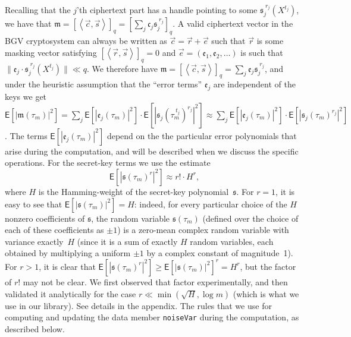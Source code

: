\documentclass[14pt]{extarticle}
\newcommand{\grp}[1]{\left\langle #1 \right\rangle}
\def\EXP{\mathsf{E}}
\def\vr{\vec{r}}
\def\ve{\vec{e}}
\def\vc{\vec{c}}
\def\vs{\vec{s}}
\newcommand{\ee}{\mathfrak{e}}
\newcommand{\ct}{\mathfrak{c}}
\newcommand{\mm}{\mathfrak{m}}
\newcommand{\sk}{\mathfrak{s}}
\begin{document}
Recalling that the $j$'th ciphertext part has a handle pointing to
some $\sk_j^{\;r_j}(X^{t_j})$, we have that $\mm=[\grp{\vc,\vs}]_q=
[\sum_j\ct_j\sk_j^{\;r_j}]_q$. A valid ciphertext vector in the BGV
cryptosystem can always be written as $\vc=\vr+\ve$ such that $\vr$
is some masking vector satisfying $[\grp{\vr,\vs}]_q=0$ and $\ve=
(\ee_1,\ee_2,\ldots)$ is such that $\|\ee_j\cdot\sk_j^{\;r_j}(X^{t_j})
\|\ll q$. We therefore have $\mm=[\grp{\vc,\vs}]_q=\sum_j\ee_j
\sk_j^{\;r_j}$, and under the heuristic assumption that the ``error
terms'' $\ee_j$ are independent of the keys we get 
$\EXP[|\mm(\tau_m)|^2] = \sum_j\EXP[|\ee_j(\tau_m)|^2] \cdot 
                               \EXP[|\sk_j(\tau_m^{\;t_j})^{r_j}|^2]
\approx \sum_j\EXP[|\ee_j(\tau_m)|^2] \cdot \EXP[|\sk_j(\tau_m)^{r_j}|^2]$.
The terms $\EXP[|\ee_j(\tau_m)|^2]$ depend on the the particular error
polynomials that arise during the computation, and will be described
when we discuss the specific operations. For the secret-key terms we
use the estimate
\[
\EXP\left[\left|\sk(\tau_m)^{r}\right|^2\right]\approx r! \cdot H^r,
\]
where $H$ is the Hamming-weight of the secret-key polynomial~$\sk$.
For $r=1$, it is easy to see that $\EXP[|\sk(\tau_m)|^2]=H$: indeed,
for every particular choice of the $H$ nonzero coefficients of $\sk$,
the random variable $\sk(\tau_m)$ (defined over the choice of each of
these coefficients as $\pm1$) is a zero-mean complex random variable
with variance exactly~$H$ (since it is a sum of exactly $H$ random
variables, each obtained by multiplying a uniform $\pm 1$ by a complex
constant of magnitude~1). For $r>1$, it is clear that $\EXP[|\sk(\tau_m
)^{r}|^2]\ge \EXP[|\sk(\tau_m)|^2]^r=H^r$, but the factor of $r!$ may
not be clear. We first observed that factor experimentally, and then
validated it analytically for the case $r\ll\min(\sqrt{H},\log m)$
(which is what we use in our library). See details in the appendix.
%
The rules that we use for computing and updating the data member
\texttt{noiseVar} during the computation, as described below.
\end{document}
